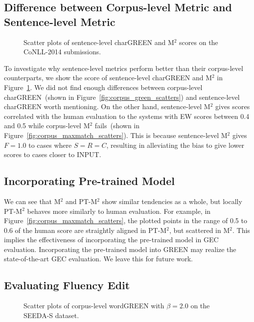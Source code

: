 \documentclass[11pt]{article}
\begin{document}
\subsection{Difference between Corpus-level Metric and Sentence-level Metric}

\begin{figure}[!t]
    \centering
    
    \scattersentchargreenb %
    \scattersentmaxmatch %
    \caption{Scatter plots of sentence-level charGREEN and M${}^2$ scores on the CoNLL-2014 submissions.}
    \label{fig:sentence_scatters}
\end{figure}

To investigate why sentence-level metrics perform better than their corpus-level counterparts, we show the score of sentence-level charGREEN and M${}^2$ in Figure~\ref{fig:sentence_scatters}.
We did not find enough differences between corpus-level charGREEN~(shown in Figure~\ref{fig:corpus_green_scatters}) and sentence-level charGREEN worth mentioning.
On the other hand, sentence-level M${}^2$ gives scores correlated with the human evaluation to the systems with EW scores between 0.4 and 0.5 while corpus-level M${}^2$ fails~(shown in Figure~\ref{fig:corpus_maxmatch_scatters}).
This is because sentence-level M${}^2$ gives $F = 1.0$ to cases where $S = R = C$, resulting in alleviating the bias to give lower scores to cases closer to \textsf{INPUT}.

\subsection{Incorporating Pre-trained Model}
\label{sec:pre_trained_model}

We can see that M${}^2$ and PT-M${}^2$ show similar tendencies as a whole, but locally PT-M${}^2$ behaves more similarly to human evaluation.
For example, in Figure~\ref{fig:corpus_maxmatch_scatters}, the plotted points in the range of 0.5 to 0.6 of the human score are straightly aligned in PT-M${}^2$, but scattered in M${}^2$.
This implies the effectiveness of incorporating the pre-trained model in GEC evaluation.
Incorporating the pre-trained model into GREEN may realize the state-of-the-art GEC evaluation.
We leave this for future work.

\subsection{Evaluating Fluency Edit}

\begin{figure}[!t]
    \centering
    
    \scatterseeda %
    \caption{Scatter plots of corpus-level wordGREEN with $\beta = 2.0$ on the SEEDA-S dataset.}
    \label{fig:seeda_scatters}
\end{figure}
\end{document}
